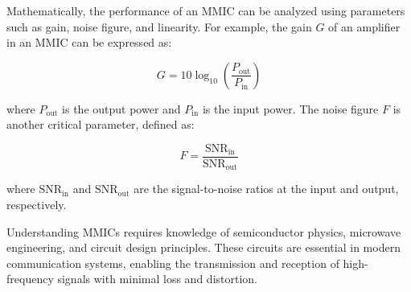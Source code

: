 Mathematically, the performance of an MMIC can be analyzed using parameters such as gain, noise figure, and linearity. For example, the gain \( G \) of an amplifier in an MMIC can be expressed as:

\[ G = 10 \log_{10} \left( \frac{P_{\text{out}}}{P_{\text{in}}} \right) \]

where \( P_{\text{out}} \) is the output power and \( P_{\text{in}} \) is the input power. The noise figure \( F \) is another critical parameter, defined as:

\[ F = \frac{\text{SNR}_{\text{in}}}{\text{SNR}_{\text{out}}} \]

where \( \text{SNR}_{\text{in}} \) and \( \text{SNR}_{\text{out}} \) are the signal-to-noise ratios at the input and output, respectively.

Understanding MMICs requires knowledge of semiconductor physics, microwave engineering, and circuit design principles. These circuits are essential in modern communication systems, enabling the transmission and reception of high-frequency signals with minimal loss and distortion.

